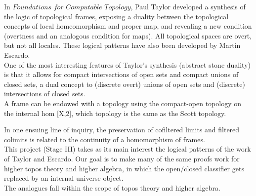 \documentclass{book}
\begin{document}
In $\textit{Foundations for Computable Topology}$, Paul Taylor developed a synthesis of the logic of topological frames, exposing a duality between the topological concepts of local homeomorphism and proper map, and revealing a new condition (overtness and an analogous condition for maps). All topological spaces are overt, but not all locales. These logical patterns have also been developed by Martin Escardo.\\

One of the most interesting features of Taylor's synthesis (abstract stone duality) is that it allows for compact intersections of open sets and compact unions of closed sets, a dual concept to (discrete overt) unions of open sets and (discrete) intersections of closed sets.\\

A frame can be endowed with a topology using the compact-open topology on the internal hom [X,2], which topology is the same as the Scott topology.

In one ensuing line of inquiry, the preservation of cofiltered limits and filtered colimits is related to the continuity of a homomorphism of frames.\\

This project (Stage III) takes as its main interest the logical patterns of the work of Taylor and Escardo. Our goal is to make many of the same proofs work for higher topos theory and higher algebra, in which the open/closed classifier gets replaced by an internal universe object.\\ 

The analogues fall within the scope of topos theory and higher algebra.\\
\end{document}
